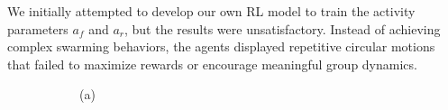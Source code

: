\documentclass[9pt]{pnas-new}
\begin{document}
We initially attempted to develop our own RL model to train the activity parameters $a_f$ and $a_r$, but the results were unsatisfactory. 
Instead of achieving complex swarming behaviors, the agents displayed repetitive circular motions that failed to maximize rewards or encourage meaningful group dynamics. 

\begin{figure}[ht]
	\centering
	\begin{subfigure}{0.30\textwidth}
		\centering
		\vspace{0.5em}
		\centering (a)
	\end{subfigure}
	\hfill
	\begin{subfigure}{0.30\textwidth}
		\centering

\end{subfigure}
\end{figure}
\end{document}

